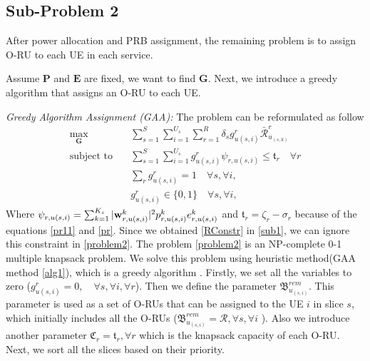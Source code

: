 \documentclass[lettersize,journal]{IEEEtran}
\begin{document}
\subsection{Sub-Problem 2}\label{sub2}
After power allocation and PRB assignment, the remaining problem is to assign O-RU to each UE in each service.

Assume $\boldsymbol{P}$ and $\boldsymbol{E}$ are fixed, we want to find $\boldsymbol{G}$.
Next, we introduce a greedy algorithm that assigns an O-RU to each UE.

\textit{Greedy Algorithm Assignment (GAA):}
The problem can be reformulated as follow
\begin{subequations}\label{problem2}
\begin{alignat}{4}
\max\limits_{ \boldsymbol{G} }   \quad &  \sum_{s=1}^S\sum_{i=1}^{U_s}\sum_{r=1}^{R} \delta_s g^r_{u(s,i)}\bar{\mathcal{R}}^r_{u_{(s,k)}} \ \\
\text{subject to} \quad  & \sum_{s=1}^{S}\sum_{i=1}^{U_s} g_{u(s,i)}^r \psi_{r,u(s,i)}\leq \mathfrak{t}_r \quad \forall r
 \label{p11} \\
& \sum_{r}g^r_{u(s,i)} = 1  \quad \forall s,\forall i, \label{p12}\\
 & g^r_{u(s,i)} \in \{0,1\} \quad \forall s,\forall i, \label{p13}  
\end{alignat}
\end{subequations}
Where $ \psi_{r,u(s,i)}=\sum_{k=1}^{K_s}|\bold{w}_{r,u(s,i)}^{k}|^2 p_{r,u(s,i)}^{k}  e^k_{r,u(s,i)}$
and $\mathfrak{t}_r = \zeta_r- \sigma_r$  because of the equations \eqref{pr11} and \eqref{pr}.
Since we obtained \eqref{RConstr} in \eqref{sub1}, we can ignore this constraint in \eqref{problem2}.
The problem \eqref{problem2} is an NP-complete 0-1 multiple knapsack problem.  
We solve this problem using heuristic method(GAA method \ref{alg1}), which is a greedy algorithm \cite{akccay2007greedy,lee2018dynamic}.
Firstly, we set all the variables to zero ($g^r_{u(s,i)} = 0, \quad \forall s, \forall i, \forall r$). 
Then we define the parameter ${\mathfrak{B}}^{rem}_{u_{(s,i)}}$. This parameter is used as a set of O-RUs that can be assigned to the UE $i$ in slice $s$, which initially includes all the O-RUs (${\mathfrak{B}}^{rem}_{u_{(s,i)}} = \mathcal{R}, \forall s, \forall i$ ). 
Also we introduce another parameter $ \mathfrak{C}_r = \mathfrak{t}_r, \forall r$
which is the knapsack capacity of each O-RU.
Next, we sort all the slices based on their priority. 
\end{document}
